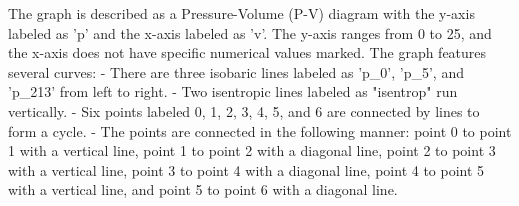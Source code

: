 The graph is described as a Pressure-Volume (P-V) diagram with the y-axis labeled as 'p' and the x-axis labeled as 'v'. The y-axis ranges from 0 to 25, and the x-axis does not have specific numerical values marked. The graph features several curves:
- There are three isobaric lines labeled as 'p_0', 'p_5', and 'p_213' from left to right.
- Two isentropic lines labeled as "isentrop" run vertically.
- Six points labeled 0, 1, 2, 3, 4, 5, and 6 are connected by lines to form a cycle.
- The points are connected in the following manner: point 0 to point 1 with a vertical line, point 1 to point 2 with a diagonal line, point 2 to point 3 with a vertical line, point 3 to point 4 with a diagonal line, point 4 to point 5 with a vertical line, and point 5 to point 6 with a diagonal line.
